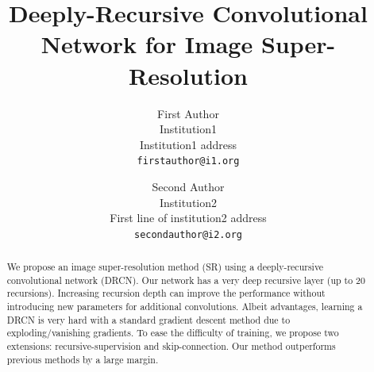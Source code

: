 \documentclass[10pt,twocolumn,letterpaper]{article}
\begin{document}


\title{Deeply-Recursive Convolutional Network for Image Super-Resolution}

\author{First Author\\
	Institution1\\
	Institution1 address\\
	{\tt\small firstauthor@i1.org}
	\and
	Second Author\\
	Institution2\\
	First line of institution2 address\\
	{\tt\small secondauthor@i2.org}
}

\maketitle



\begin{abstract}
We propose an image super-resolution method (SR) using a deeply-recursive convolutional network (DRCN). Our network has a very deep recursive layer (up to 20 recursions). Increasing recursion depth can improve the performance without introducing new parameters for additional convolutions. Albeit advantages, learning a DRCN is very hard with a standard gradient descent method due to exploding/vanishing gradients. To ease the difficulty of training, we propose two extensions: recursive-supervision and skip-connection. Our method outperforms previous methods by a large margin.
\end{abstract}
\end{document}
